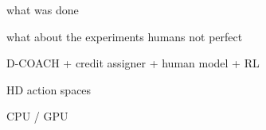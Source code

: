 \begin{conclusion}
what was done

what about the experiments humans not perfect 

D-COACH + credit assigner + human model + RL

HD action spaces

CPU / GPU


\end{conclusion}
